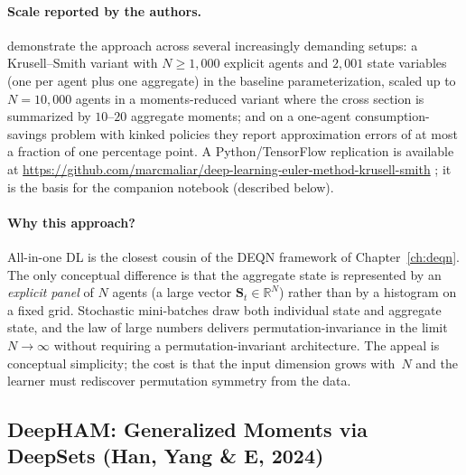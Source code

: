\documentclass[11pt,a4paper]{report}
\newcommand{\R}{\mathbb{R}}
\begin{document}
\paragraph{Scale reported by the authors.}
\citet{maliar2021deep} demonstrate the approach across several increasingly demanding setups: a Krusell--Smith variant with $N \geq 1{,}000$ explicit agents and $2{,}001$ state variables (one per agent plus one aggregate) in the baseline parameterization, scaled up to $N = 10{,}000$ agents in a moments-reduced variant where the cross section is summarized by $10$--$20$ aggregate moments; and on a one-agent consumption-savings problem with kinked policies they report approximation errors of at most a fraction of one percentage point.  A Python/TensorFlow replication is available at \url{https://github.com/marcmaliar/deep-learning-euler-method-krusell-smith} \citep{marcmaliar2022dlks}; it is the basis for the companion notebook  (described below).

\paragraph{Why this approach?}
All-in-one DL is the closest cousin of the DEQN framework of Chapter~\ref{ch:deqn}.  The only conceptual difference is that the aggregate state is represented by an \emph{explicit panel} of $N$ agents (a large vector $\bm{S}_t \in \R^N$) rather than by a histogram on a fixed grid.  Stochastic mini-batches draw both individual state and aggregate state, and the law of large numbers delivers permutation-invariance in the limit $N \to \infty$ without requiring a permutation-invariant architecture.  The appeal is conceptual simplicity; the cost is that the input dimension grows with~$N$ and the learner must rediscover permutation symmetry from the data.

\subsection{DeepHAM: Generalized Moments via DeepSets (Han, Yang \& E, 2024)}
\label{sec:deepham_ks}
\end{document}
